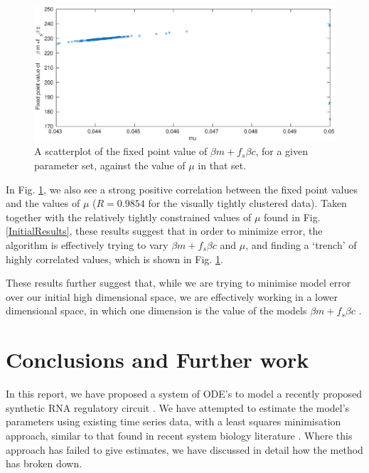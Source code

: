 \documentclass[10pt,journal]{./IEEE_latex_class/IEEEtran}
\begin{document}
\begin{figure}[h]	
    \centering
        \includegraphics[scale = 0.25]{fixedpoint_mu}
        \caption{A scatterplot of the fixed point value of $\beta m +f_{s}\beta c$, for a given parameter set, against the value of $\mu$ in that set.}
        \label{fixedpoint_mu} 
\end{figure} 

In Fig. \ref{fixedpoint_mu}, we also see a strong positive correlation between the fixed point values and the values of $\mu$ ($R = 0.9854$ for the visually tightly clustered data). Taken together with the relatively tightly constrained values of $\mu$ found in Fig. \ref{InitialResults}, these results suggest that in order to minimize error, the algorithm is effectively trying to vary $\beta m +f_{s}\beta c$ and $\mu$, and finding a `trench' of highly correlated values, which is shown in Fig. \ref{fixedpoint_mu}. 

These results further suggest that, while we are trying to minimise model error over our initial high dimensional space, we are effectively working in a lower dimensional space, in which one dimension is the value of the models $\beta m +f_{s}\beta c$ .
 
 
\section{Conclusions and Further work}
\label{Conclusions and Further work}

In this report, we have proposed a system of ODE's to model a recently proposed synthetic RNA regulatory circuit \cite{Rodrigo2012}. We have attempted to estimate the model's parameters using existing time series data, with a least squares minimisation approach, similar to that found in recent system biology literature \cite{Hu2015}. Where this approach has failed to give estimates, we have discussed in detail how the method has broken down.
\end{document}
